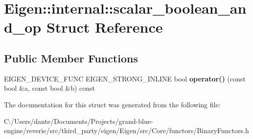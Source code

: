 \hypertarget{struct_eigen_1_1internal_1_1scalar__boolean__and__op}{}\section{Eigen\+::internal\+::scalar\+\_\+boolean\+\_\+and\+\_\+op Struct Reference}
\label{struct_eigen_1_1internal_1_1scalar__boolean__and__op}
\subsection*{Public Member Functions}
\begin{DoxyCompactItemize}
\item 
\mbox{\label{struct_eigen_1_1internal_1_1scalar__boolean__and__op_a61bd564952d2be227b136762bd70d403}} 
E\+I\+G\+E\+N\+\_\+\+D\+E\+V\+I\+C\+E\+\_\+\+F\+U\+NC E\+I\+G\+E\+N\+\_\+\+S\+T\+R\+O\+N\+G\+\_\+\+I\+N\+L\+I\+NE bool {\bfseries operator()} (const bool \&a, const bool \&b) const
\end{DoxyCompactItemize}


The documentation for this struct was generated from the following file\+:\begin{DoxyCompactItemize}
\item 
C\+:/\+Users/dante/\+Documents/\+Projects/grand-\/blue-\/engine/reverie/src/third\+\_\+party/eigen/\+Eigen/src/\+Core/functors/Binary\+Functors.\+h\end{DoxyCompactItemize}
